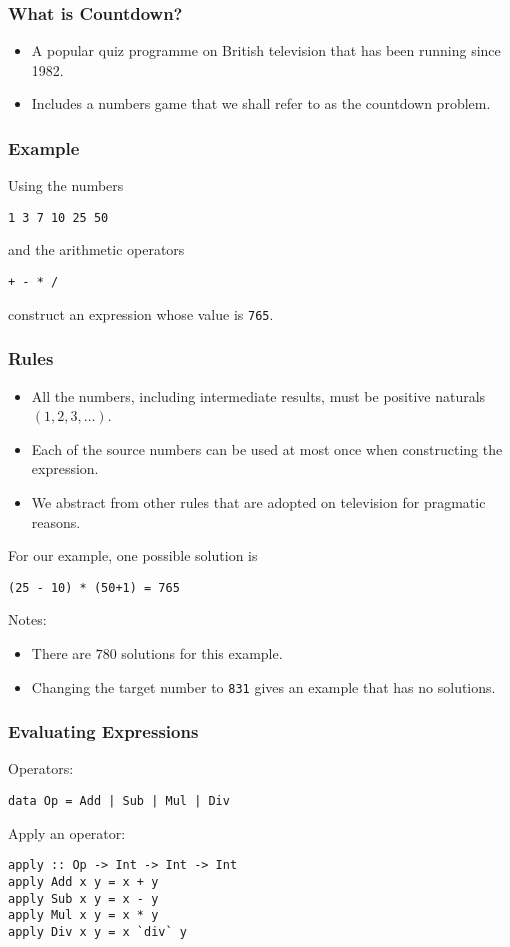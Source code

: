 \begin{multicols}{2}
\subsubsection{What is Countdown?}
\begin{itemize}
  \item A popular quiz programme on British television that has been running since 1982.
  \item Includes a numbers game that we shall refer to as the countdown problem.
\end{itemize}

\subsubsection{Example}
Using the numbers
\begin{lstlisting}
1 3 7 10 25 50
\end{lstlisting}
and the arithmetic operators
\begin{lstlisting}
+ - * /
\end{lstlisting}
construct an expression whose value is \lstinline{765}.

\subsubsection{Rules}
\begin{itemize}
  \item All the numbers, including intermediate results, must be positive naturals \((1,2,3,\ldots)\).
  \item Each of the source numbers can be used at most once when constructing the expression.
  \item We abstract from other rules that are adopted on television for pragmatic reasons.
\end{itemize}

For our example, one possible solution is
\begin{lstlisting}
(25 - 10) * (50+1) = 765
\end{lstlisting}

Notes:
\begin{itemize}
  \item There are \(780\) solutions for this example.
  \item Changing the target number to \lstinline{831} gives an example that has no solutions.
\end{itemize}

\subsubsection{Evaluating Expressions}
Operators:
\begin{lstlisting}
data Op = Add | Sub | Mul | Div
\end{lstlisting}
Apply an operator:
\begin{lstlisting}
apply :: Op -> Int -> Int -> Int
apply Add x y = x + y
apply Sub x y = x - y
apply Mul x y = x * y
apply Div x y = x `div` y
\end{lstlisting}


\end{multicols}
